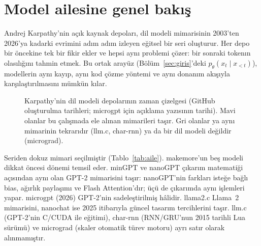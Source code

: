 \section{Model ailesine genel bakış}\label{sec:aile}

Andrej Karpathy'nin açık kaynak depoları, dil modeli mimarisinin 2003'ten 2026'ya kadarki evrimini adım adım izleyen eğitsel bir seri oluşturur. Her depo bir öncekine tek bir fikir ekler ve hepsi aynı problemi çözer: bir sonraki tokenın olasılığını tahmin etmek. Bu ortak arayüz (Bölüm~\ref{sec:giris}'deki $p_\theta(x_t \mid x_{<t})$), modellerin aynı kayıp, aynı kod çözme yöntemi ve aynı donanım akışıyla karşılaştırılmasını mümkün kılar.

\begin{figure}[h]
  \centering
  \caption[Karpathy'nin dil modeli depoları]{Karpathy'nin dil modeli depolarının zaman çizelgesi (GitHub oluşturulma tarihleri; microgpt için açıklama yazısının tarihi). Mavi olanlar bu çalışmada ele alınan mimarileri taşır. Gri olanlar ya aynı mimarinin tekrarıdır (llm.c, char-rnn) ya da bir dil modeli değildir (micrograd).}
  \label{fig:zaman}
\end{figure}

Seriden dokuz mimari seçilmiştir (Tablo~\ref{tab:aile}). makemore'un \cite{makemore} beş modeli dikkat öncesi dönemi temsil eder. minGPT ve nanoGPT \cite{nanogpt} çıkarım matematiği açısından aynı olan GPT-2 mimarisini taşır: nanoGPT'nin farkları isteğe bağlı bias, ağırlık paylaşımı ve Flash Attention'dır; üçü de çıkarımda aynı işlemleri yapar. microgpt (2026) \cite{microgpt} GPT-2'nin sadeleştirilmiş hâlidir. llama2.c \cite{llama2c} Llama~2 \cite{llama2} mimarisini, nanochat \cite{nanochat} ise 2025 itibarıyla güncel tasarım tercihlerini taşır. llm.c (GPT-2'nin C/CUDA ile eğitimi), char-rnn (RNN/GRU'nun 2015 tarihli Lua sürümü) ve micrograd (skaler otomatik türev motoru) ayrı satır olarak alınmamıştır.

